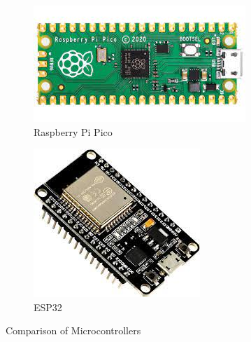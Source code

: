 \begin{figure}[h!]
    \centering
    \begin{subfigure}{0.45\linewidth} %
        \centering
        \includegraphics[width=\linewidth]{images/pico.jpg}
        \caption{Raspberry Pi Pico \cite{ref23}}
        \label{fig:pico}
    \end{subfigure}
    \hfill %
    \begin{subfigure}{0.45\linewidth} %
        \centering
        \includegraphics[width=\linewidth]{images/esp32(1).jpg}
        \caption{ESP32 \cite{ref24}}
        \label{fig:esp32}
    \end{subfigure}
    \caption{Comparison of Microcontrollers}
    \label{fig:comparison}
\end{figure}

